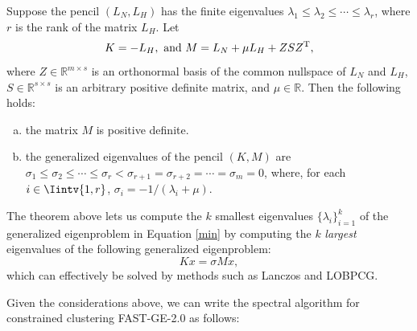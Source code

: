 \begin{theorem}
   Suppose the pencil $(L_N, L_H)$ has the finite eigenvalues $\lambda_1 \le \lambda_2 \le \cdots \le \lambda_r$, where $r$ is the rank of the matrix $L_H$. Let
   \begin{equation}\label{regularization}
      K = - L_H,  \text{ and } M = L_N + \mu L_H + ZSZ^{\rm T},
   \end{equation}
   where $Z \in \mathbb R^{m \times s}$ is an orthonormal basis of the common nullspace of $L_N$ and $L_H$, $S \in \mathbb R ^{s \times s}$ is an arbitrary positive definite matrix, and $\mu \in \mathbb R$.
   Then the following holds:
   \begin{enumerate}[(a)]
      \item the matrix $M$ is positive definite.
      \item the generalized eigenvalues of the pencil $(K, M)$ are $\sigma _1 \le \sigma_2 \le \cdots \le \sigma_r < \sigma_{r+1} = \sigma_{r+2} = \cdots = \sigma_m = 0$, where, for each $i \in \Iintv{1,r}$, $\sigma_i = -1/(\lambda_i + \mu)$.
   \end{enumerate}
\end{theorem}

The theorem above lets us compute the $k$ smallest eigenvalues $\{ \lambda_i \}_{i=1}^k$ of the generalized eigenproblem in Equation \vref{min} by computing the $k$ \textit{largest} eigenvalues of the following generalized eigenproblem:
\begin{equation}
K x = \sigma M x,
\end{equation}
which can effectively be solved by methods such as Lanczos and LOBPCG.

Given the considerations above, we can write the spectral algorithm for constrained clustering FAST-GE-2.0 as follows:

